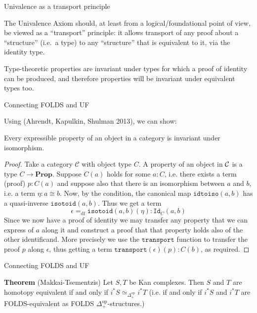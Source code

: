\documentclass[8pt]{beamer}
\begin{document}
\begin{frame}{Univalence as a transport principle}

  The Univalence Axiom should, at least from a logical/foundational
  point of view, be viewed as a ``transport'' principle: it allows
  transport of any proof about a ``structure'' (i.e.\ a type) to any
  ``structure'' that is equivalent to it, via the identity type.

  Type-theoretic properties are invariant under types for which a
  proof of identity can be produced, and therefore properties will be
  invariant under equivalent types too.


\end{frame}



\begin{frame}{Connecting FOLDS and UF} 

  Using (Ahrendt, Kapulkin, Shulman 2013), we can show:


\begin{theorem} Every expressible property of an object in a
  category is invariant under isomorphism. \end{theorem}


\begin{proof}
  Take a category $\mathcal{C}$ with object type $C$. A property of an
  object in $\mathcal C$ is a type $C \rightarrow \textbf{Prop}$. Suppose
  $C(a)$ holds for some $a \colon C$, i.e. there exists a term (proof)
  $p \colon C(a)$ and suppose also that there is an isomorphism
  between $a$ and $b$, i.e. a term $\eta \colon a \cong b$. Now, by
  the condition, the canonical map $\mathtt{idtoiso}(a,b)$ has a
  quasi-inverse $\mathtt{isotoid}(a,b)$. Thus we get a term $$
  \epsilon =_{\text{df}} \mathtt{isotoid}(a,b)(\eta) \colon
  \mathtt{Id}_C (a,b)$$ Since we now have a proof of identity we may
  transfer any property that we can express of $a$ along it and
  construct a proof that that property holds also of the other
  identificand. More precisely we use the $\mathtt{transport}$
  function to transfer the proof $p$ along $\epsilon$, thus getting a
  term $\mathtt{transport}(\epsilon)(p) \colon C(b)$, as required.
\end{proof}

\end{frame}


\begin{frame}{Connecting FOLDS and UF}


  \textbf{Theorem} (Makkai-Tsementzis) Let $S,T$ be Kan
  complexes. Then $S$ and $T$ are homotopy equivalent if and only if
  $i^*S \simeq_{\Delta_+^{\text{op}}} i^*T$ (i.e. if and only if
  $i^*S$ and $i^*T$ are FOLDS-equivalent as FOLDS
  $\Delta_+^{\text{op}}$-structures.)

  \end{frame}
\end{document}
